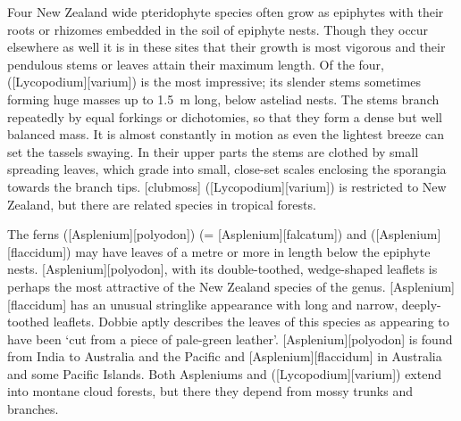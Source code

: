 Four New Zealand wide pteridophyte species often grow as epiphytes with their roots or rhizomes embedded in the soil of epiphyte nests.
Though they occur elsewhere as well it is in these sites that their growth is most vigorous and their pendulous stems or leaves attain their maximum length.
Of the four,  ([Lycopodium][varium]) is the most impressive; its slender stems sometimes forming huge masses up to \SI{1.5}{\metre} long, below asteliad nests.
The stems branch repeatedly by equal forkings or dichotomies, so that they form a dense but well balanced mass.
It is almost constantly in motion as even the lightest breeze can set the tassels swaying.
In their upper parts the stems are clothed by small spreading leaves, which grade into small, close-set scales enclosing the sporangia towards the branch tips.
[clubmoss] ([Lycopodium][varium]) is restricted to New Zealand, but there are related species in tropical forests.

The ferns  ([Asplenium][polyodon]) (= [Asplenium][falcatum]) and  ([Asplenium][flaccidum]) may have leaves of a metre or more in length below the epiphyte nests.
[Asplenium][polyodon], with its double-toothed, wedge-shaped leaflets is perhaps the most attractive of the New Zealand species of the genus.
[Asplenium][flaccidum] has an unusual stringlike appearance with long and narrow, deeply-toothed leaflets.
Dobbie aptly describes the leaves of this species as appearing to have been `cut from a piece of pale-green leather'.
[Asplenium][polyodon] is found from India to Australia and the Pacific and [Asplenium][flaccidum] in Australia and some Pacific Islands.
Both Aspleniums and  ([Lycopodium][varium]) extend into montane cloud forests, but there they depend from mossy trunks and branches.

